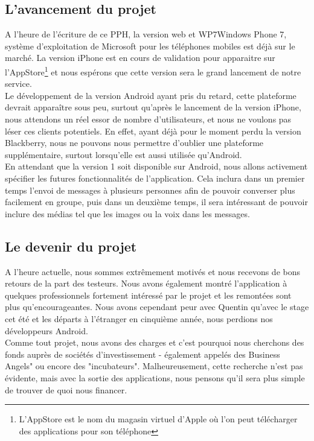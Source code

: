 \documentclass{article}
\begin{document}
	\subsection{L'avancement du projet}
	A l'heure de l'écriture de ce PPH, la version web et WP7{Windows Phone 7, système d'exploitation de Microsoft pour les téléphones mobiles} est déjà sur le marché. La version iPhone est en cours de validation pour apparaitre sur l'AppStore\footnote{L'AppStore est le nom du magasin virtuel d'Apple où l'on peut télécharger des applications pour son téléphone} et nous espérons que cette version sera le grand lancement de notre service. \\
	
	Le développement de la version Android ayant pris du retard, cette plateforme devrait apparaître sous peu, surtout qu'après le lancement de la version iPhone, nous attendons un réel essor de nombre d'utilisateurs, et nous ne voulons pas léser ces clients potentiels. En effet, ayant déjà pour le moment perdu la version Blackberry, nous ne pouvons nous permettre d'oublier une plateforme supplémentaire, surtout lorsqu'elle est aussi utilisée qu'Android. \\
	
	En attendant que la version 1 soit disponible sur Android, nous allons activement spécifier les futures fonctionnalités de l'application. Cela inclura dans un premier temps l'envoi de messages à plusieurs personnes afin de pouvoir converser plus facilement en groupe, puis dans un deuxième temps, il sera intéressant de pouvoir inclure des médias tel que les images ou la voix dans les messages.  
	
	\subsection{Le devenir du projet}
	A l'heure actuelle, nous sommes extrêmement motivés et nous recevons de bons retours de la part des testeurs. Nous avons également montré l'application à quelques professionnels fortement intéressé par le projet et les remontées sont plus qu'encourageantes.  Nous avons cependant peur avec Quentin qu'avec le stage cet été et les départs à l'étranger en cinquième année, nous perdions nos développeurs Android. \\
	
	Comme tout projet, nous avons des charges et c'est pourquoi nous cherchons des fonds auprès de sociétés d'investissement - également appelés des Business Angels" ou encore des "incubateurs". Malheureusement, cette recherche n’est pas évidente, mais avec la sortie des applications, nous pensons qu’il sera plus simple de trouver de quoi nous financer.  
	
\end{document}
